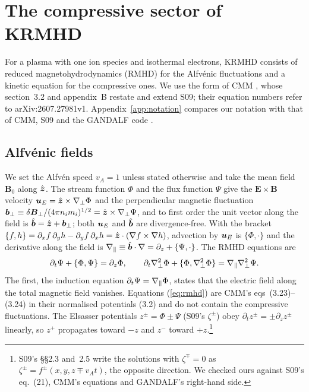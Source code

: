 \section{The compressive sector of KRMHD}\label{sec:model}

For a plasma with one ion species and isothermal electrons, KRMHD \citep{Schekochihin2009} consists of reduced magnetohydrodynamics (RMHD) for the Alfv\'enic fluctuations and a kinetic equation for the compressive ones. We use the form of CMM \citep{Chandran2026}, whose section~3.2 and appendix~B restate and extend S09; their equation numbers refer to arXiv:2607.27981v1. Appendix~\ref{app:notation} compares our notation with that of CMM, S09 and the GANDALF code \citep{Kanekar2025}.

\subsection{Alfv\'enic fields}\label{mod:alfven}

We set the Alfv\'en speed $v_A=1$ unless stated otherwise and take the mean field $\boldsymbol B_0$ along $\hat{\boldsymbol z}$. The stream function $\Phi$ and the flux function $\Psi$ give the $\boldsymbol E\times\boldsymbol B$ velocity $\boldsymbol u_E=\hat{\boldsymbol z}\times\nabla_\perp\Phi$ and the perpendicular magnetic fluctuation $\boldsymbol b_\perp\equiv\delta\boldsymbol B_\perp/(4\pi n_im_i)^{1/2}=\hat{\boldsymbol z}\times\nabla_\perp\Psi$, and to first order the unit vector along the field is $\hat{\boldsymbol b}=\hat{\boldsymbol z}+\boldsymbol b_\perp$; both $\boldsymbol u_E$ and $\hat{\boldsymbol b}$ are divergence-free. With the bracket $\{f,h\}=\partial_xf\,\partial_yh-\partial_yf\,\partial_xh=\hat{\boldsymbol z}\cdot(\nabla f\times\nabla h)$, advection by $\boldsymbol u_E$ is $\{\Phi,\cdot\}$ and the derivative along the field is $\nabla_\parallel\equiv\hat{\boldsymbol b}\cdot\nabla=\partial_z+\{\Psi,\cdot\}$. The RMHD equations are \citep[eqs~17--18]{Schekochihin2009}
\begin{equation}\label{eq:rmhd}
  \partial_t\Psi+\{\Phi,\Psi\}=\partial_z\Phi,\qquad
  \partial_t\nabla_\perp^2\Phi+\{\Phi,\nabla_\perp^2\Phi\}=\nabla_\parallel\nabla_\perp^2\Psi .
\end{equation}
The first, the induction equation $\partial_t\Psi=\nabla_\parallel\Phi$, states that the electric field along the total magnetic field vanishes. Equations (\ref{eq:rmhd}) are CMM's eqs~(3.23)--(3.24) in their normalised potentials (3.2) and do not contain the compressive fluctuations. The Elsasser potentials $z^\pm=\Phi\pm\Psi$ (S09's $\zeta^\pm$) obey $\partial_tz^\pm=\pm\partial_zz^\pm$ linearly, so $z^+$ propagates toward $-z$ and $z^-$ toward $+z$.\footnote{S09's \S\S2.3 and~2.5 write the solutions with $\zeta^\mp=0$ as $\zeta^\pm=f^\pm(x,y,z\mp v_At)$, the opposite direction. We checked ours against S09's eq.~(21), CMM's equations and GANDALF's right-hand side.}

